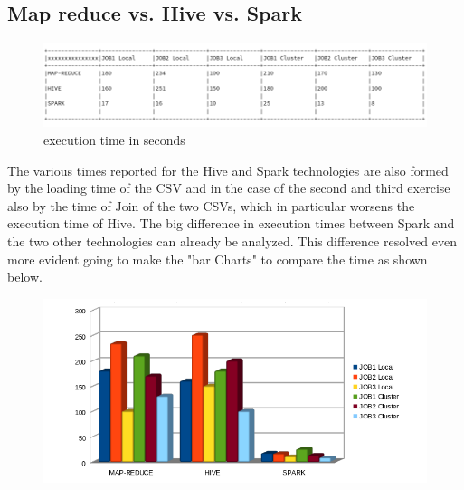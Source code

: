 \documentclass[]{report}
\begin{document}
\subsection*{Map reduce vs. Hive vs. Spark}
\begin{center}
\begin{figure}[!htb]
		\hspace{-1cm}
		\includegraphics[width=1.2 \linewidth]{figure/valori}
		\caption{execution time in seconds}
\end{figure}
\end{center}
The various times reported for the Hive and Spark technologies are also formed by the loading time of the CSV and in the case of the second and third exercise also by the time of Join of the two CSVs, which in particular worsens the execution time of Hive.
The big difference in execution times between Spark and the two other technologies can already be analyzed. This difference resolved even more evident going to make the "bar Charts" to compare the time as shown below.
\newpage
\begin{center}

\begin{figure}[!htb]
	\hspace{-2.3 cm}
	\vspace{1.5 cm}
	\includegraphics[width=1.5 \linewidth]{figure/grafico1}
\end{figure}
\end{center}
\end{document}
